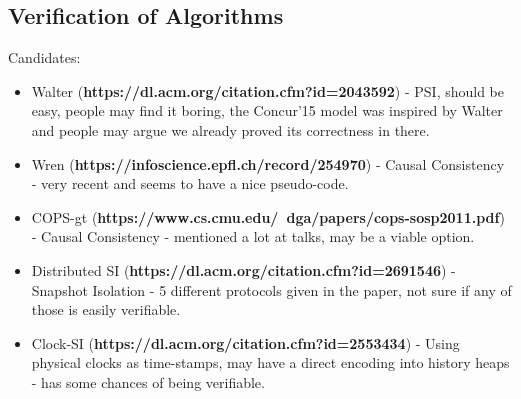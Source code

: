\documentclass[a4paper,UKenglish]{article}%
\theoremstyle{plain}
\begin{document}
\subsection{Verification of Algorithms} 
Candidates: 
\begin{itemize}
\item Walter (\textbf{https://dl.acm.org/citation.cfm?id=2043592}) - PSI, should be easy, 
people may find it boring, the Concur'15 model was inspired by Walter and people may argue we 
already proved its correctness in there.
\item Wren (\textbf{https://infoscience.epfl.ch/record/254970}) - Causal Consistency - very recent and seems to have 
a nice pseudo-code.\\
\item COPS-gt (\textbf{https://www.cs.cmu.edu/~dga/papers/cops-sosp2011.pdf}) - Causal Consistency -  mentioned a lot at 
talks, may be a viable option.
\item Distributed SI (\textbf{https://dl.acm.org/citation.cfm?id=2691546}) - Snapshot Isolation - 5 different protocols given in the paper, 
not sure if any of those is easily verifiable.\\ 
\item Clock-SI (\textbf{https://dl.acm.org/citation.cfm?id=2553434}) - Using physical clocks as time-stamps, may have a direct encoding 
into history heaps - has some chances of being verifiable.
\end{itemize}



\end{document}
